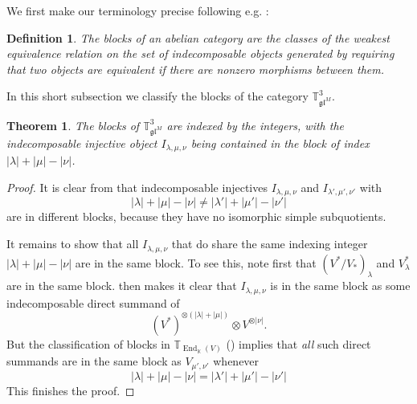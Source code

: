 \documentclass[11pt]{article}
\theoremstyle{plain}
\newtheorem{theorem}[lemma]{Theorem}
\theoremstyle{nonumberplain}
\theoremstyle{plain}
\newtheorem{definition}[lemma]{Definition}
\theoremstyle{nonumberplain}
\newtheorem{proof}{Proof}
\newcommand\bK{{\mathbb K}}
\newcommand\bT{{\mathbb T}}
\newcommand\fgl{\mathfrak{gl}}
\DeclareMathOperator{\End}{\mathrm{End}}
\newcommand{\define}[1]{{\em #1}}
\begin{document}
We first make our terminology precise following e.g. \cite[$\S$ 5.1]{ComOst11}:


\begin{definition}\label{def.blocks}
  The \define{blocks} of an abelian category are the classes of the weakest equivalence relation on the set of indecomposable objects generated by requiring that two objects are equivalent if there are nonzero morphisms between them. 
\end{definition}


 


In this short subsection we classify the blocks of the category $\bT^3_{\fgl^M}$.


\begin{theorem}\label{th.blocks}
  The blocks of $\bT^3_{\fgl^M}$ are indexed by the integers, with the indecomposable injective object $I_{\lambda,\mu,\nu}$ being contained in the block of index $|\lambda|+|\mu|-|\nu|$. 
\end{theorem}
\begin{proof}
  It is clear from  that indecomposable injectives $I_{\lambda,\mu,\nu}$ and $I_{\lambda',\mu',\nu'}$ with 
  \begin{equation*}
    |\lambda|+|\mu|-|\nu|\ne |\lambda'|+|\mu'|-|\nu'|
  \end{equation*}
are in different blocks, because they have no isomorphic simple subquotients. 

It remains to show that all $I_{\lambda,\mu,\nu}$ that do share the same indexing integer $|\lambda|+|\mu|-|\nu|$ are in the same block. To see this, note first that $(V^*/V_*)_\lambda$ and $V^*_\lambda$ are in the same block.  then makes it clear that $I_{\lambda,\mu,\nu}$ is in the same block as some indecomposable direct summand of 
\begin{equation*}
(V^*)^{\otimes (|\lambda|+|\mu|)}\otimes V^{\otimes |\nu|}.  
\end{equation*}
But the classification of blocks in $\bT_{\End_\bK(V)}$ (\cite[Corollary 6.6]{DPS}) implies that \define{all} such direct summands are in the same block as $V_{\mu',\nu'}$ whenever
\begin{equation*}
    |\lambda|+|\mu|-|\nu| = |\lambda'|+|\mu'|-|\nu'|
\end{equation*}
This finishes the proof. 
\end{proof}
\end{document}
